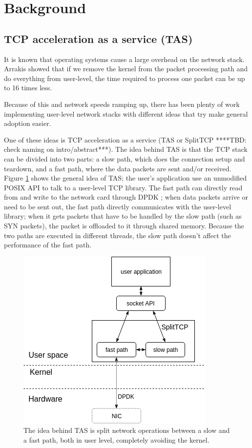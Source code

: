 \section{Background}\label{Background}

%
%

\subsection{TCP acceleration as a service (TAS)}

It is known that operating systems cause a large overhead on the network
stack. Arrakis \cite{peter:arrakis} showed that if we remove the kernel
from the packet processing path and do everything from user-level, the time 
required to process one packet can be up to 16 times less.

Because of this and network speeds ramping up, there has been plenty of work implementing
user-level network stacks \cite{mtcp, utcp, janus, alpine, lwip, fstack} with different ideas that try make general adoption
easier.

One of these ideas is TCP acceleration as a service (TAS or SplitTCP  ****TBD: check naming on intro/abstract***).
The idea behind TAS is that the TCP stack can be divided into two parts: a slow path, which does the connection
setup and teardown, and a fast path, where the data packets are sent and/or received. Figure \ref{fig:splittcp} 
shows the general idea of TAS; the user's application use an unmodified POSIX API to talk to a user-level TCP
library. The fast path can directly read from and write to the network card through DPDK \cite{dpdk}; when data packets
arrive or need to be sent out, the fast path directly communicates with the user-level library;
when it gets packets that have to be handled by the slow path (such as SYN packets), the packet 
is offloaded to it through shared memory. Because the two paths are executed in different threads, the slow path doesn't
affect the performance of the fast path.


\begin{figure}
\centering
\includegraphics[width=0.7\columnwidth]{figures/splittcp_default.png}
\caption{The idea behind TAS is split network operations between a slow and a fast path, both in user level, completely
avoiding the kernel.}
\label{fig:splittcp}
\end{figure}


